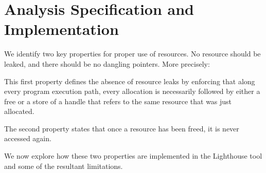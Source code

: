 \section{Analysis Specification and Implementation}
\label{sec:alg}

We identify two key properties for proper use of resources.  No
resource should be leaked, and there should be no dangling pointers.
More precisely:

\smallskip{} This first property defines the
absence of resource leaks by enforcing that along every program
execution path, every allocation is necessarily followed by either a
free or a store of a handle that refers to the same resource that was
just allocated.

\smallskip{} The second property
states that once a resource has been freed, it is never accessed
again.

We now explore how these two properties are implemented in the
Lighthouse tool and some of the resultant limitations.

